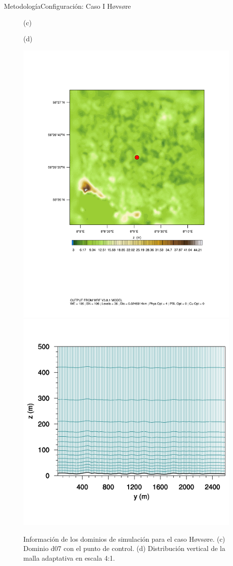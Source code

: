 \documentclass[mathserif,10pt]{beamer}
\begin{document}
\begin{frame}{Metodología}{Configuración: Caso I Høvsøre}
	\begin{figure}[H]
		\centering
		\begin{minipage}{0.5\linewidth}
			\center \hspace{1.5cm}(c)
		\end{minipage}%
		\begin{minipage}{0.5\linewidth}
			\center(d)
		\end{minipage}%
		
		\includegraphics[width=0.45\linewidth,trim={2.5cm 6.5cm 2cm 3.5cm},clip]{fig/05/hov_control_point.pdf}%
		\includegraphics[width=0.45\linewidth,trim={0.5cm 0cm 0cm -1.3cm},clip]{fig/05/mesh57}%
		
		\caption{Información de los dominios de simulación para el caso Høvsøre. (c) Dominio d07 con el punto de control. (d) Distribución vertical de la malla adaptativa en escala 4:1.}
		\label{fig:05_dom_hov_b}
	\end{figure}
\end{frame}
\end{document}
